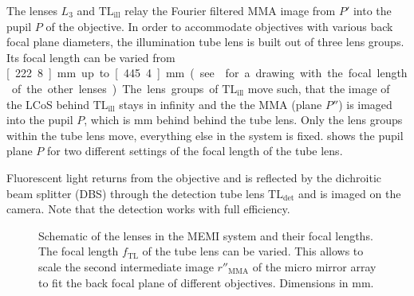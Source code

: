 The lenses $L_3$ and $\textrm{TL}_\textrm{ill}$ relay the Fourier
filtered MMA image from $P'$ into the pupil $P$ of the objective. In
order to accommodate objectives with various back focal plane
diameters, the illumination tube lens is built out of three lens
groups. Its focal length can be varied from \unit[222.8]{mm} up to
\unit[445.4]{mm} (see  for a drawing with the
focal length of the other lenses). The lens groups of
$\textrm{TL}_\textrm{ill}$ move such, that the image of the LCoS
behind $\textrm{TL}_\textrm{ill}$ stays in infinity and the the MMA
(plane $P''$) is imaged into the pupil $P$, which is \unit[250]{mm}
behind behind the tube lens. Only the lens groups within the tube lens
move, everything else in the system is
fixed.  shows the pupil plane $P$ for two
different settings of the focal length of the tube lens.

Fluorescent light returns from the objective and is reflected by the
dichroitic beam splitter (DBS) through the detection tube lens
$\textrm{TL}_\textrm{det}$ and is imaged on the camera. Note that the
detection works with full efficiency.

\begin{figure}
   \centering
   \def\svgscale{2}
   
   \caption{Schematic of the lenses in the MEMI system and their focal
     lengths. The focal length $f_\textrm{TL}$ of the tube lens can be
     varied. This allows to scale the second intermediate image
     $r''_\textrm{MMA}$ of the micro mirror array to fit the back
     focal plane of different objectives. Dimensions in mm.}
   \label{fig:memi-sketch}
 \end{figure}
 



